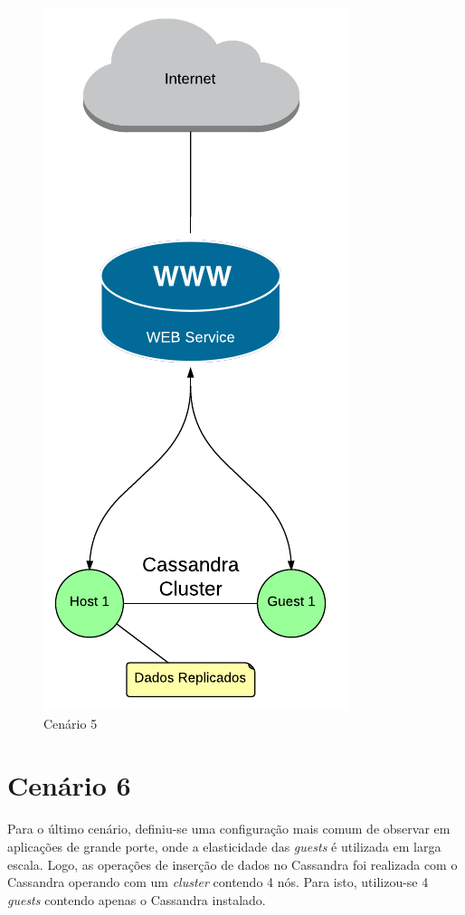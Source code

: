     \begin{figure}[H]
    \centering
    \includegraphics[scale=0.60]{imagens/BD-1Host1Guest.pdf}
    \caption{Cenário 5}
    \label{fig:bd1host1guest}
    \end{figure} 



\section{Cenário 6}
Para o último cenário, definiu-se uma configuração mais comum de observar em aplicações de grande porte, onde a elasticidade das \textit{guests} é utilizada em larga escala. Logo, as operações de inserção de dados no Cassandra foi realizada com o Cassandra operando com um \textit{cluster} contendo 4 nós.
Para isto, utilizou-se 4 \textit{guests} contendo apenas o Cassandra instalado.

